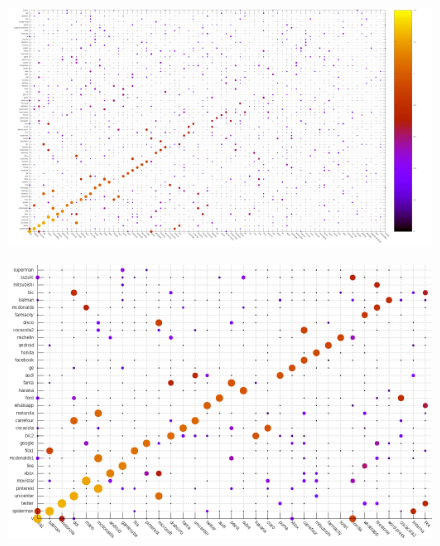 \documentclass{beamer}
\begin{document}
\begin{frame}
\begin{figure}[h]
 \centering
  \begin{minipage}[c]{1\textwidth}
	\centering	
	\includegraphics[scale=0.13]{random.png}
  \end{minipage}
\end{figure}
\end{frame}

\begin{frame}
\begin{figure}[h]
 \centering
  \begin{minipage}[c]{1\textwidth}
	\centering	
	\includegraphics[scale=0.32]{randomx.png}
  \end{minipage}
\end{figure}
\end{frame}

\end{document}
